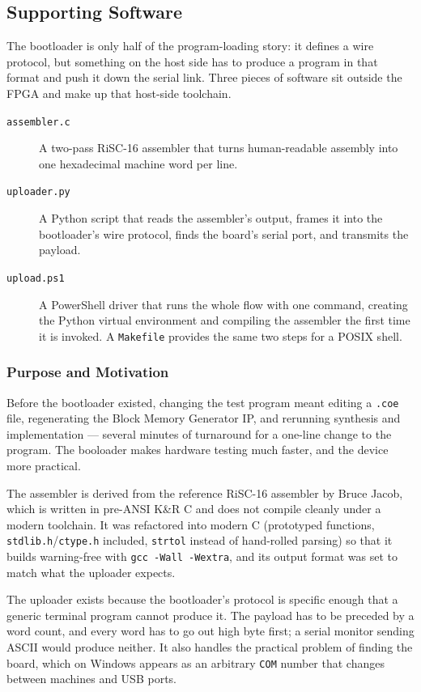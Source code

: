 \documentclass[11pt,letterpaper]{article}
\begin{document}
\subsection{Supporting Software}
The bootloader is only half of the program-loading story: it defines a wire
protocol, but something on the host side has to produce a program in that
format and push it down the serial link. Three pieces of software sit outside
the FPGA and make up that host-side toolchain.

\begin{description}
  \item[\texttt{assembler.c}] A two-pass RiSC-16 assembler that turns
    human-readable assembly into one hexadecimal machine word per line.
  \item[\texttt{uploader.py}] A Python script that reads the assembler's
    output, frames it into the bootloader's wire protocol, finds the board's
    serial port, and transmits the payload.
  \item[\texttt{upload.ps1}] A PowerShell driver that runs the whole flow with
    one command, creating the Python virtual environment and compiling the
    assembler the first time it is invoked. A \texttt{Makefile} provides the
    same two steps for a POSIX shell.
\end{description}

\subsubsection{Purpose and Motivation}
Before the bootloader existed, changing the test program meant editing a
\texttt{.coe} file, regenerating the Block Memory Generator IP, and rerunning
synthesis and implementation --- several minutes of turnaround for a one-line
change to the program. The booloader makes hardware testing much faster, and the
device more practical.

The assembler is derived from the reference RiSC-16
assembler by Bruce Jacob, which is written in pre-ANSI K\&R C and does not
compile cleanly under a modern toolchain. It was refactored into modern C
(prototyped functions, \texttt{stdlib.h}/\texttt{ctype.h} included,
\texttt{strtol} instead of hand-rolled parsing) so that it builds warning-free
with \texttt{gcc -Wall -Wextra}, and its output format was set to match what
the uploader expects.

The uploader exists because the bootloader's protocol is specific enough that
a generic terminal program cannot produce it. The payload has to be preceded by
a word count, and every word has to go out high byte first; a serial monitor
sending ASCII would produce neither. It also handles the practical problem of
finding the board, which on Windows appears as an arbitrary \texttt{COM} number
that changes between machines and USB ports.
\end{document}
